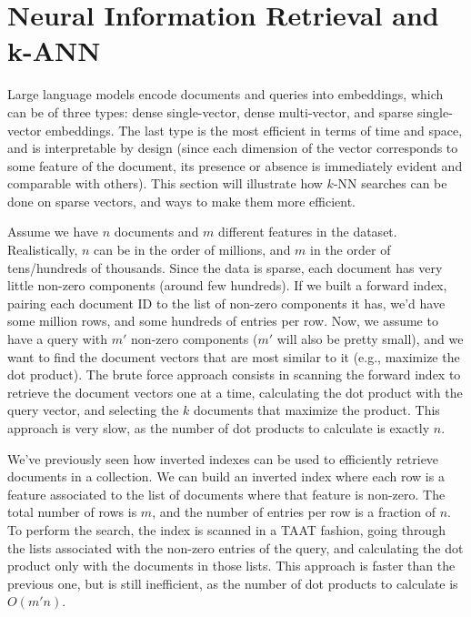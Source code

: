 \section{Neural Information Retrieval and k-ANN}

Large language models encode documents and queries into embeddings, which can be of three types: dense single-vector, dense multi-vector, and sparse single-vector embeddings. The last type is the most efficient in terms of time and space, and is interpretable by design (since each dimension of the vector corresponds to some feature of the document, its presence or absence is immediately evident and comparable with others). This section will illustrate how $k$-NN searches can be done on sparse vectors, and ways to make them more efficient.

Assume we have $n$ documents and $m$ different features in the dataset. Realistically, $n$ can be in the order of millions, and $m$ in the order of tens/hundreds of thousands. Since the data is sparse, each document has very little non-zero components (around few hundreds). If we built a forward index, pairing each document ID to the list of non-zero components it has, we'd have some million rows, and some hundreds of entries per row. Now, we assume to have a query with $m'$ non-zero components ($m'$ will also be pretty small), and we want to find the document vectors that are most similar to it (e.g., maximize the dot product). The brute force approach consists in scanning the forward index to retrieve the document vectors one at a time, calculating the dot product with the query vector, and selecting the $k$ documents that maximize the product. This approach is  very slow, as the number of dot products to calculate is exactly $n$.

We've previously seen how inverted indexes can be used to efficiently retrieve documents in a collection. We can build an inverted index where each row is a feature associated to the list of documents where that feature is non-zero. The total number of rows is $m$, and the number of entries per row is a fraction of $n$. To perform the search, the index is scanned in a TAAT fashion, going through the lists associated with the non-zero entries of the query, and calculating the dot product only with the documents in those lists. This approach is faster than the previous one, but is still inefficient, as the number of dot products to calculate is $O(m'n)$.


